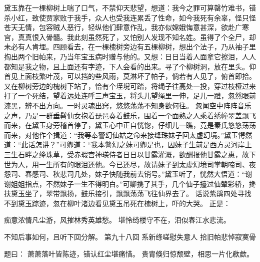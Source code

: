 \documentclass[12pt,oneside]{book}
\begin{document}
黛玉靠在一棵柳树上喘了口气，不禁仰天悲望，想道：我今之罪可算罄竹难书，错杀小红，致使贾家败于我手，众人也受我连累丢了性命，如今我死有余辜，怪只怪苍天无情，包容贼人恶行，轻纵他们肆意作乱，我亦似嫦娥悔意甚深，欲赴广寒宫，真真恨入骨髓。我此刻虽然死了，又怕别人发现不知名姓。虽得了个全尸，却未必有人肯埋。四顾看去，在一棵槐树旁边有五棵柳树，想出个法子，乃从袖子里掏出两个旧帕来，乃当年宝玉病时赠与他的。又想：日日当着人面拿它擦泪，人人都知是我之物，且上面还有字迹，下人会看的出来。寻了个柳树洞，放在里头。仰首见上面枝繁叶茂，可以挡的些风雨，莫淋坏了帕子，倘若有人见了，俯首即拾。又在柳树旁边的槐树下站了，恰有个垤堄可踏，将绳子往高处一投，穿过枝桠过来打了一个死结，望着远处连呼三声宝玉，将头儿望绳里一伸，足儿一蹬，忽然眼前漆黑，辨不出方向。一时灵魂出窍，悠悠荡荡不知身欲何往。
忽闻空中阵阵音乐之声，乃是一群垂髫仙女抱着琵琶奏着鼓乐，围着一个面熟之人乘着绣幢翠盖飘飞而来，在黛玉身旁稽首停了，黛玉心中正自恍惚，仔细儿一瞧，竟是秦氏悠悠荡荡而来，对他作个揖道：“我等奉警幻仙姑之命来接绛珠妹子回太虚幻境。”黛玉愕然道：“此话怎讲？”可卿道：“我本警幻之妹可卿是也，因妹子生前是西方灵河岸上三生石畔之绛珠草，受赤瑕宫神瑛侍者日日以甘露灌溉，欲酬报他甘露之惠，故下世为人，用一生所有的眼泪还他。今已还尽，故请妹子到太虚幻境司掌朝啼司、夜怨司、春感司、秋悲司几处，妹子快随我前去销号。”黛玉听了，恍然大悟道：“谢谢姐姐指点，不然妹子一生不得明白。”可卿携了其手，几个仙子擡过仙辇彩轿，搀扶黛玉坐了，翠带飘扬，鼓乐接引，飘飘荡荡飞往仙界去了。
话说紫鹃四处寻找不到黛玉踪迹，忽在柳叶渚边看见黛玉吊死在槐树上，吓的大哭。
正是：

痴意浓情凡尘游，风摧林秀英雄愁。
堪怜绮楼守不在，泪似春江水悲流。

不知后事如何，且听下回分解。 
第九十八回 系新绦嗟慰失意人 拾旧帕悲悼寂寞骨

题曰：
萧萧落叶皆陈迹，错认红尘堪痛惜。
贵胄倏归惊颓壁，相思一片化欷歔。
\end{document}
